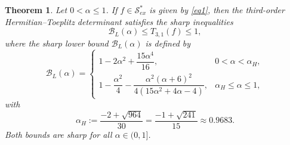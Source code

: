\documentclass[11pt,reqno]{amsart}
\newtheorem{theo}{Theorem}[section]
\numberwithin{equation}{section}
\begin{document}
\begin{theo}\label{T4}
Let $0<\alpha\le 1$. If $f\in\mathcal{S}_{ex}^{\ast}$ is given by \eqref{eq1}, then the third-order Hermitian--Toeplitz determinant satisfies the sharp inequalities
\begin{equation}\label{ND26}
\mathcal{B}_L(\alpha)\le T_{3,1}(f)\le 1,
\end{equation}
where the sharp lower bound $\mathcal{B}_L(\alpha)$ is defined by
\begin{equation}\label{ND27}
\mathcal{B}_L(\alpha)=
\begin{cases}
1-2\alpha^2+\dfrac{15\alpha^4}{16}, & 0<\alpha<\alpha_H,\\[6pt]
1-\dfrac{\alpha^2}{4}-\dfrac{\alpha^2(\alpha+6)^2}{4(15\alpha^2+4\alpha-4)}, & \alpha_H\le\alpha\le1,
\end{cases}
\end{equation}
with
\[
\alpha_H:=\frac{-2+\sqrt{964}}{30}
=\frac{-1+\sqrt{241}}{15}
\approx0.9683.
\]
Both bounds are sharp for all $\alpha\in(0,1]$.
\end{theo}
\end{document}
